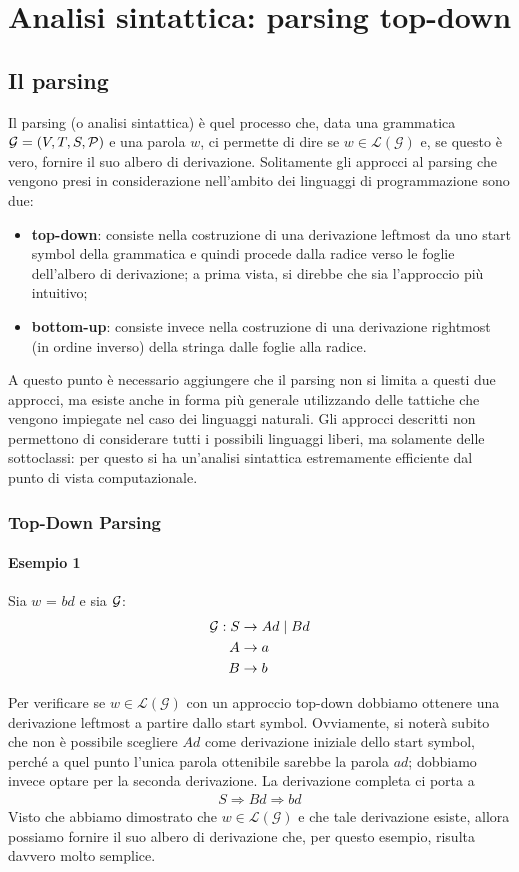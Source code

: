 \documentclass[class=book, crop=false, oneside, 12pt]{standalone}
\begin{document}
\chapter{Analisi sintattica: parsing top-down}

\section{Il parsing}
Il parsing (o analisi sintattica) è quel processo che, data una grammatica \(\mathcal{G} = (V, T, S, \mathcal{P})\) e una parola \(w\), ci permette di dire se \(w \in \mathcal{L(G)}\) e, se questo è vero, fornire il suo albero di derivazione. Solitamente gli approcci al parsing che vengono presi in considerazione nell'ambito dei linguaggi di programmazione sono due: 
\begin{itemize}
    \item \textbf{top-down}: consiste nella costruzione di una derivazione leftmost da uno start symbol della grammatica e quindi procede dalla radice verso le foglie dell'albero di derivazione; a prima vista, si direbbe che sia l'approccio più intuitivo;
    \item \textbf{bottom-up}: consiste invece nella costruzione di una derivazione rightmost (in ordine inverso) della stringa dalle foglie alla radice.
\end{itemize}
A questo punto è necessario aggiungere che il parsing non si limita a questi due approcci, ma esiste anche in forma più generale utilizzando delle tattiche che vengono impiegate nel caso dei linguaggi naturali. Gli approcci descritti non permettono di considerare tutti i possibili linguaggi liberi, ma solamente delle sottoclassi: per questo si ha un'analisi sintattica estremamente efficiente dal punto di vista computazionale.

\subsection{Top-Down Parsing}
\subsubsection{Esempio 1}
Sia \(w\) = \(bd\) e sia \(\mathcal{G}\): 
\begin{align*}
    \mathcal{G}: S &\rightarrow Ad \mid Bd \\
    A &\rightarrow a \\
    B &\rightarrow b
\end{align*}

Per verificare se \(w \in \mathcal{L(G)}\) con un approccio top-down dobbiamo ottenere una derivazione leftmost a partire dallo start symbol. Ovviamente, si noterà subito che non è possibile scegliere \(Ad\) come derivazione iniziale dello start symbol, perché a quel punto l'unica parola ottenibile sarebbe la parola \(ad\); dobbiamo invece optare per la seconda derivazione. La derivazione completa ci porta a
\begin{align*}
    S \Rightarrow Bd \Rightarrow bd
\end{align*}
Visto che abbiamo dimostrato che \(w \in \mathcal{L(G)}\) e che tale derivazione esiste, allora possiamo fornire il suo albero di derivazione che, per questo esempio, risulta davvero molto semplice.
\end{document}
